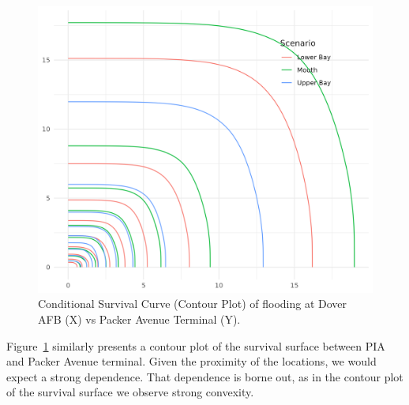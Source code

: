 \begin{figure}[htb]
    \centering
    \includegraphics[width=0.3\linewidth]{./plots/condsurv/pia_packer}
    \caption{Conditional Survival Curve (Contour Plot) of flooding at Dover AFB (X) vs Packer Avenue Terminal (Y). 
        \label{fig:condsurv2d:piapacker}
        }
\end{figure}

Figure~\ref{fig:condsurv2d:piapacker} similarly presents a contour plot of the survival surface between 
    PIA and Packer Avenue terminal. Given the proximity of the locations, we would expect a strong 
    dependence.  That dependence is borne out, as in the contour plot of the survival surface we observe 
    strong convexity.




